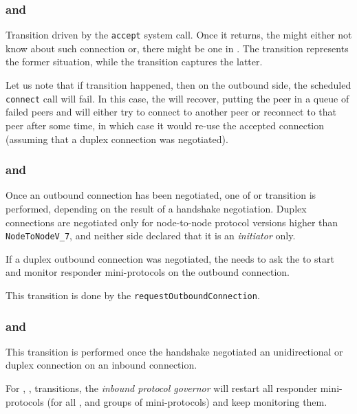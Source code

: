 \subsubsection{\Accepted{} and \Overwritten{}}
Transition driven by the \texttt{accept} system call. Once it returns, the
\connmngr{} might either not know about such connection or, there might be one
in \ReservedOutboundState{}. The \Accepted{} transition represents the former
situation, while the \Overwritten{} transition captures the latter.

Let us note that if \Overwritten{} transition happened, then on the outbound
side, the scheduled \texttt{connect} call will fail. In this case, the
\ptopgov{} will recover, putting the peer in a queue of failed peers and
will either try to connect to another peer or reconnect to that peer after some
time, in which case it would re-use the accepted connection (assuming that
a duplex connection was negotiated).

\subsubsection{\NegotiatedUniOut{} and \NegotiatedDupOut{}}
Once an outbound connection has been negotiated, one of \NegotiatedUniOut{} or
\NegotiatedDupOut{} transition is performed, depending on the result of a handshake
negotiation. Duplex connections are negotiated only for node-to-node protocol
versions higher than \texttt{NodeToNodeV\_7}, and neither side declared that it is an \emph{initiator} only.

If a duplex outbound connection was negotiated, the \connmngr{} needs to ask the
\inbgov{} to start and monitor responder mini-protocols on the outbound
connection.

\begin{detail}
This transition is done by the \texttt{requestOutboundConnection}.
\end{detail}


\subsubsection{\NegotiatedUniIn{} and \NegotiatedDupIn{}}
This transition is performed once the handshake negotiated an unidirectional or
duplex connection on an inbound connection.

For \NegotiatedUniIn{}, \NegotiatedDupIn{}, \NegotiatedDupOut{}
transitions, the \textit{inbound protocol governor} will restart all responder
mini-protocols (for all \established{}, \warm{} and \hot{} groups of
mini-protocols) and keep monitoring them.

